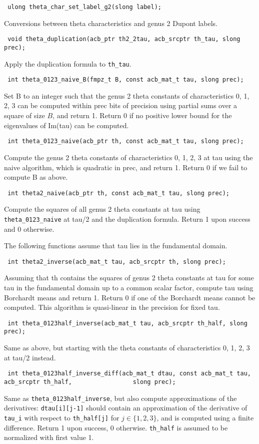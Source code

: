 \documentclass{article}
\newcommand{\code}[1]{\lstinline:#1:}
\newcommand{\fun}[1]{\vspace{2mm}\noindent \code{#1}}
\begin{document}
\fun{
ulong theta_char_set_label_g2(slong label);
}

Conversions between theta characteristics and genus 2 Dupont labels.

\fun{
void theta_duplication(acb_ptr th2_2tau, acb_srcptr th_tau, slong prec);
}

Apply the duplication formula to \code{th_tau}.

\fun{
int theta_0123_naive_B(fmpz_t B, const acb_mat_t tau, slong prec);
}

Set B to an integer such that the genus 2 theta constants of
characteristics 0, 1, 2, 3 can be computed within prec bits of
precision using partial sums over a square of size $B$, and return
1. Return 0 if no positive lower bound for the eigenvalues of Im(tau)
can be computed.

\fun{
int theta_0123_naive(acb_ptr th, const acb_mat_t tau, slong prec);
}

Compute the genus 2 theta constants of characteristics 0, 1, 2, 3 at
tau using the naive algorithm, which is quadratic in prec, and return
1. Return 0 if we fail to compute B as above.

\fun{
int theta2_naive(acb_ptr th, const acb_mat_t tau, slong prec);
}

Compute the squares of all genus 2 theta constants at tau using
\code{theta_0123_naive} at tau/2 and the duplication formula. Return 1
upon success and 0 otherwise.

The following functions assume that tau lies in the fundamental domain.

\fun{
int theta2_inverse(acb_mat_t tau, acb_srcptr th, slong prec);
}

Assuming that th contains the squares of genus 2 theta constants at
tau for some tau in the fundamental domain up to a common scalar
factor, compute tau using Borchardt means and return 1. Return 0 if
one of the Borchardt means cannot be computed. This algorithm is
quasi-linear in the precision for fixed tau.

\fun{
int theta_0123half_inverse(acb_mat_t tau, acb_srcptr th_half, slong prec);
}

Same as above, but starting with the theta constants of
characteristics 0, 1, 2, 3 at tau/2 instead.

\fun{
int theta_0123half_inverse_diff(acb_mat_t dtau, const acb_mat_t tau, acb_srcptr th_half,
				slong prec);
}

Same as \code{theta_0123half_inverse}, but also compute approximations
of the derivatives: \code{dtau[i][j-1]} should contain an
approximation of the derivative of \code{tau_i} with respect to
\code{th_half[j]} for $j\in\{1,2,3\}$, and is computed using a finite
difference. Return 1 upon success, 0 otherwise. \code{th_half} is
assumed to be normalized with first value 1.
\end{document}
